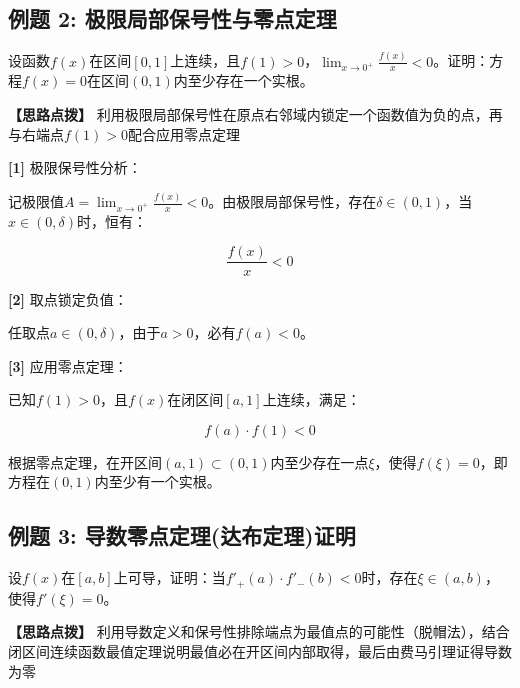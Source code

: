 \documentclass[11pt,a4paper,UTF8]{ctexart}
\begin{document}
\subsection{例题 2: 极限局部保号性与零点定理}

设函数$f(x)$在区间$[0, 1]$上连续，且$f(1) > 0$，$\lim_{x \to 0^+} \frac{f(x)}{x} < 0$。证明：方程$f(x) = 0$在区间$(0, 1)$内至少存在一个实根。

\textbf{\color{DeepPurple}【思路点拨】} 利用极限局部保号性在原点右邻域内锁定一个函数值为负的点，再与右端点$f(1) > 0$配合应用零点定理


\begin{solbox}[分步推导与答题规范]
\textbf{[1]} 极限保号性分析：

记极限值$A = \lim_{x \to 0^+} \frac{f(x)}{x} < 0$。由极限局部保号性，存在$\delta \in (0, 1)$，当$x \in (0, \delta)$时，恒有：


\begin{equation*}
\frac{f(x)}{x} < 0
\end{equation*}


\textbf{[2]} 取点锁定负值：

任取点$a \in (0, \delta)$，由于$a > 0$，必有$f(a) < 0$。

\textbf{[3]} 应用零点定理：

已知$f(1) > 0$，且$f(x)$在闭区间$[a, 1]$上连续，满足：


\begin{equation*}
f(a) \cdot f(1) < 0
\end{equation*}


根据零点定理，在开区间$(a, 1) \subset (0, 1)$内至少存在一点$\xi$，使得$f(\xi) = 0$，即方程在$(0, 1)$内至少有一个实根。
\end{solbox}


\subsection{例题 3: 导数零点定理(达布定理)证明}

设$f(x)$在$[a, b]$上可导，证明：当$f'_+(a) \cdot f'_-(b) < 0$时，存在$\xi \in (a, b)$，使得$f'(\xi) = 0$。

\textbf{\color{DeepPurple}【思路点拨】} 利用导数定义和保号性排除端点为最值点的可能性（脱帽法），结合闭区间连续函数最值定理说明最值必在开区间内部取得，最后由费马引理证得导数为零
\end{document}
